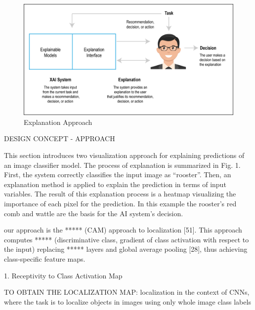 


\begin{figure}[htbp]
\centering
\includegraphics[width=1\textwidth]{images/xai-1-01.png}
\caption{Explanation Approach}
\label{fig:explanation-approach}
\end{figure}


DESIGN CONCEPT - APPROACH

This section introduces two visualization approach for explaining predictions of an image classifier model. The process of explanation is summarized in Fig. 1. First, the system correctly classifies the input image as “rooster”. Then, an explanation method is applied to explain the prediction in terms of input variables. The result of this explanation process is a heatmap visualizing the importance of each pixel for the prediction. In this example the rooster’s red comb and wattle are the basis for the AI system’s decision.

our approach is the ***** (CAM) approach to localization [51]. This approach computes ***** (discriminative class, gradient of class activation with respect to the input) replacing ***** layers and global average pooling [28], thus achieving class-specific feature maps. 

1. Receptivity to Class Activation Map

TO OBTAIN THE LOCALIZATION MAP:
localization in the context of CNNs, where the task is to localize objects in images using only whole image class labels

